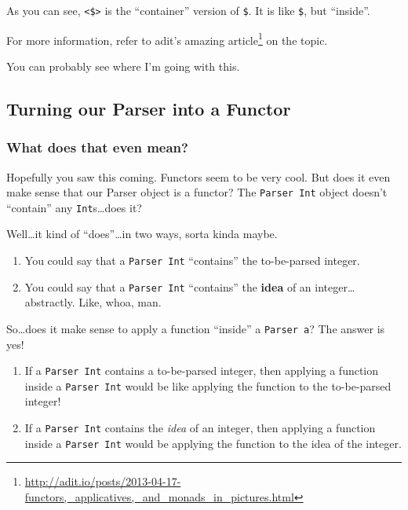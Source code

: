 \documentclass[]{article}
\renewcommand{\href}[2]{#2\footnote{\url{#1}}}
\begin{document}
As you can see, \texttt{\textless{}\$\textgreater{}} is the
``container'' version of \texttt{\$}. It is like \texttt{\$}, but
``inside''.

For more information, refer to adit's
\href{http://adit.io/posts/2013-04-17-functors,_applicatives,_and_monads_in_pictures.html}{amazing
article} on the topic.

You can probably see where I'm going with this.

\subsection{Turning our Parser into a
Functor}\label{turning-our-parser-into-a-functor}

\subsubsection{What does that even
mean?}\label{what-does-that-even-mean}

Hopefully you saw this coming. Functors seem to be very cool. But does
it even make sense that our Parser object is a functor? The
\texttt{Parser\ Int} object doesn't ``contain'' any
\texttt{Int}s\ldots{}does it?

Well\ldots{}it kind of ``does''\ldots{}in two ways, sorta kinda maybe.

\begin{enumerate}
\def\labelenumi{\arabic{enumi}.}
\tightlist
\item
  You could say that a \texttt{Parser\ Int} ``contains'' the
  to-be-parsed integer.
\item
  You could say that a \texttt{Parser\ Int} ``contains'' the
  \textbf{idea} of an integer\ldots{}abstractly. Like, whoa, man.
\end{enumerate}

So\ldots{}does it make sense to apply a function ``inside'' a
\texttt{Parser\ a}? The answer is yes!

\begin{enumerate}
\def\labelenumi{\arabic{enumi}.}
\tightlist
\item
  If a \texttt{Parser\ Int} contains a to-be-parsed integer, then
  applying a function inside a \texttt{Parser\ Int} would be like
  applying the function to the to-be-parsed integer!
\item
  If a \texttt{Parser\ Int} contains the \emph{idea} of an integer, then
  applying a function inside a \texttt{Parser\ Int} would be applying
  the function to the idea of the integer.
\end{enumerate}
\end{document}
